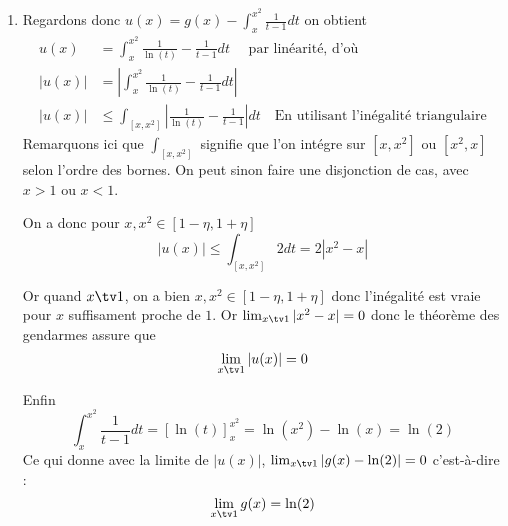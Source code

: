 \documentclass[a4paper, 11pt,reqno]{article}
\begin{document}
\begin{correction}
\begin{enumerate}
\begin{enumerate}
\item Regardons donc $u(x)= g(x) -\int_x^{x^2} \frac{1}{t-1} dt $ on obtient 
\begin{align*}
u(x) &= \int_x^{x^2} \frac{1}{\ln(t)} - \frac{1}{t-1} dt \quad \text{ par linéarité, d'où} \\
|u(x) |& = \left| \int_x^{x^2} \frac{1}{\ln(t)} - \frac{1}{t-1} dt\right| \\
|u(x)| &\leq \int_{[x, {x^2}]}  \left| \frac{1}{\ln(t)} - \frac{1}{t-1} \right|dt \quad{ \text{En utilisant l'inégalité triangulaire} }
\end{align*}
Remarquons ici que  $\int_{[x, {x^2}]}  $ signifie que l'on intégre sur $[x,x^2]$ ou $[x^2,x]$ selon l'ordre des bornes. On peut sinon faire une disjonction de cas, avec $x>1$ ou $x<1$. 

On a donc pour $x,x^2\in [1-\eta, 1+\eta]$ 
$$|u(x)| \leq \int_{[x, {x^2}]} 2dt = 2|x^2-x| $$  

Or quand $x\tv 1$, on a bien $x,x^2 \in   [1-\eta, 1+\eta]$  donc l'inégalité est vraie pour $x$ suffisament proche de $1$. 
Or $\lim_{x\tv 1} |x^2-x|=  0$ donc le théorème des gendarmes assure que 
$$\lim_{x\tv 1} |u(x) | =0$$

Enfin $$\int_x^{x^2} \frac{1}{t-1}dt = [\ln(t)]_x^{x^2} = \ln(x^2) -\ln(x) =\ln(2)$$
Ce qui donne avec la limite de $|u(x)|$, $\lim_{x\tv 1} |g(x)-\ln(2)| =0$ 
c'est-à-dire :
$$\lim_{x\tv 1} g(x) =\ln(2)$$
\end{enumerate}


\end{enumerate}
\end{correction}
\end{document}
